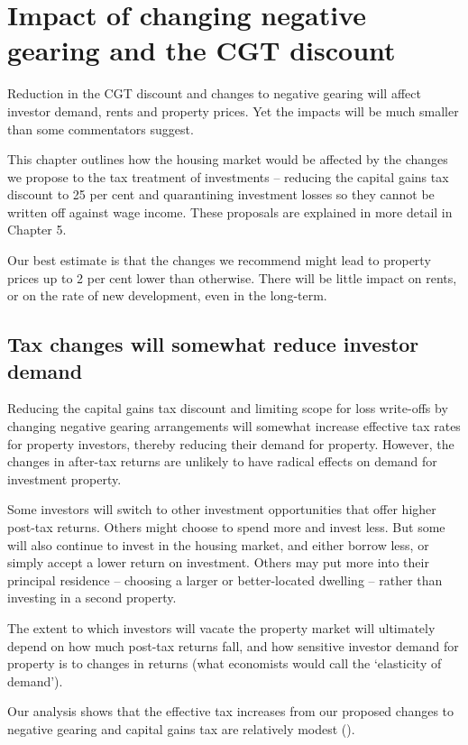 \chapter{Impact of changing negative gearing and the CGT discount}\label{chapter:Impacts}
Reduction in the CGT discount and changes to negative gearing will affect investor demand, rents and property prices. Yet the impacts will be much smaller than some commentators suggest. 

This chapter outlines how the housing market would be affected by the changes we propose to the tax treatment of investments – reducing the capital gains tax discount to 25 per cent and quarantining investment losses so they cannot be written off against wage income. 
These proposals are explained in more detail in Chapter 5. 

Our best estimate is that the changes we recommend might lead to property prices up to 2 per cent lower than otherwise. There will be little impact on rents, or on the rate of new development, even in the long-term.


\section{Tax changes will somewhat reduce investor demand}
Reducing the capital gains tax discount and limiting scope for loss write-offs by changing negative gearing arrangements will somewhat increase effective tax rates for property investors, thereby reducing their demand for property. 
However, the changes in after-tax returns are unlikely to have radical effects on demand for investment property.

Some investors will switch to other investment opportunities that offer higher post-tax returns. Others might choose to spend more and invest less. But some will also continue to invest in the housing market, and either borrow less, or simply accept a lower return on investment. Others may put more into their principal residence – choosing a larger or better-located dwelling – rather than investing in a second property.

The extent to which investors will vacate the property market will ultimately depend on how much post-tax returns fall, and how sensitive investor demand for property is to changes in returns (what economists would call the ‘elasticity of demand’).

Our analysis shows that the effective tax increases from our proposed changes to negative gearing and capital gains tax are relatively modest (). 

